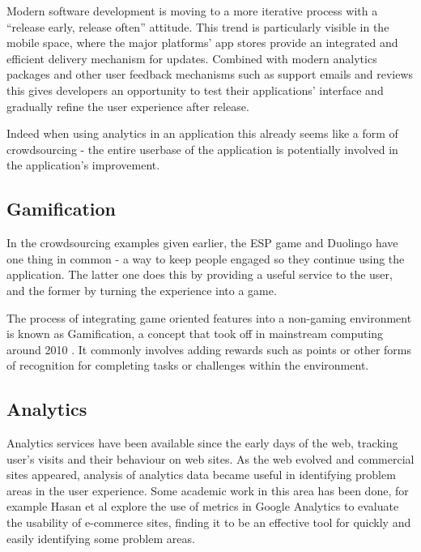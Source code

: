 Modern software development is moving to a more iterative process with
a ``release early, release often'' attitude. This trend is particularly visible
in the mobile space, where the major platforms' app stores provide an
integrated and efficient delivery mechanism for updates. Combined with modern
analytics packages and other user feedback mechanisms such as support emails
and reviews this gives developers an opportunity to test their applications'
interface and gradually refine the user experience after release.

Indeed when using analytics in an application this already seems like a form of
crowdsourcing - the entire userbase of the application is potentially involved
in the application's improvement. 

\subsection{Gamification}

In the crowdsourcing examples given earlier, the ESP game and Duolingo have one
thing in common - a way to keep people engaged so they continue using the
application. The latter one does this by providing a useful service to the
user, and the former by turning the experience into a game.

The process of integrating game oriented features into a non-gaming environment
is known as Gamification, a concept that took off in mainstream computing
around 2010 \cite{gamification-trends}. It commonly involves adding rewards
such as points or other forms of recognition for completing tasks or challenges
within the environment.

\subsection{Analytics}

Analytics services have been available since the early days of the web,
tracking user's visits and their behaviour on web sites. As the web evolved and
commercial sites appeared, analysis of analytics data became useful in
identifying problem areas in the user experience. Some academic work in this
area has been done, for example Hasan et al \cite{hasan2009using} explore the
use of metrics in Google Analytics to evaluate the usability of e-commerce
sites, finding it to be an effective tool for quickly and easily identifying
some problem areas.

